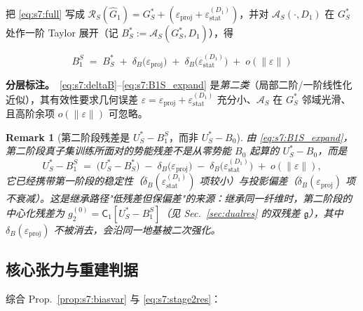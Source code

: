 \documentclass[11pt,a4paper]{article}
\newtheorem{remark}[theorem]{Remark}
\newcommand{\Rstr}{\mathcal{R}}     %
\newcommand{\Center}{\mathsf{C}}    %
\newcommand{\gres}{\bm{\mathfrak{g}}} %
\begin{document}
把 \eqref{eq:s7:full} 写成 $\Rstr_S(\widehat{G}_1)=G_S^*+(\varepsilon_{\mathrm{proj}}+\varepsilon_{\mathrm{stat}}^{(D_1)})$，并对 $\mathcal{A}_S(\cdot,D_1)$ 在 $G_S^*$ 处作一阶 Taylor 展开（记 $B_S^*:=\mathcal{A}_S(G_S^*,D_1)$），得

\begin{equation}\label{eq:s7:B1S_expand}
\boxed{\;B_1^S \;=\; B_S^* \;+\; \delta_B\bigl(\varepsilon_{\mathrm{proj}}\bigr) \;+\; \delta_B\bigl(\varepsilon_{\mathrm{stat}}^{(D_1)}\bigr) \;+\; o(\|\varepsilon\|)\;}
\end{equation}

\textbf{分层标注。}\ \eqref{eq:s7:deltaB}--\eqref{eq:s7:B1S_expand} 是\emph{第二类}（局部二阶/一阶线性化近似），其有效性要求几何误差 $\varepsilon=\varepsilon_{\mathrm{proj}}+\varepsilon_{\mathrm{stat}}^{(D_1)}$ 充分小、$\mathcal{A}_S$ 在 $G_S^*$ 邻域光滑、且高阶余项 $o(\|\varepsilon\|)$ 可忽略。

\begin{remark}[第二阶段残差是 $U_S^*-B_1^S$，而非 $U_S^*-B_0$]\label{rem:s7:residual}
由 \eqref{eq:s7:B1S_expand}，第二阶段真子集训练所面对的势能残差不是从零势能 $B_0$ 起算的 $U_S^*-B_0$，而是
\begin{equation}\label{eq:s7:stage2res}
U_S^*-B_1^S \;=\; \bigl(U_S^*-B_S^*\bigr)\;-\;\delta_B\bigl(\varepsilon_{\mathrm{proj}}\bigr)\;-\;\delta_B\bigl(\varepsilon_{\mathrm{stat}}^{(D_1)}\bigr)\;+\;o(\|\varepsilon\|),
\end{equation}
它\emph{已经携带第一阶段的稳定性（$\delta_B(\varepsilon_{\mathrm{stat}}^{(D_1)})$ 项较小）与投影偏差（$\delta_B(\varepsilon_{\mathrm{proj}})$ 项不衰减）}。这是继承路径"低残差但保偏差"的来源：继承同一纤维时，第二阶段的中心化残差为 $g_2^{(0)}=\Center_1[U_S^*-B_1^S]$（见 Sec.~\ref{sec:dualres} 的双残差 $\gres$），其中 $\delta_B(\varepsilon_{\mathrm{proj}})$ 不被消去，会沿同一地基被二次强化。
\end{remark}

\subsection{核心张力与重建判据}

综合 Prop.~\ref{prop:s7:biasvar} 与 \eqref{eq:s7:stage2res}：

\begin{center}
\end{center}
\end{document}
